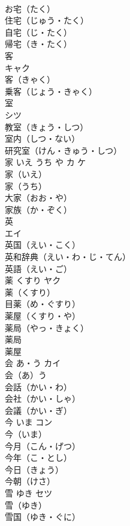 \documentclass[8pt]{extreport}
\begin{document}
\begin{CJK}{UTF8}{min}
\\	お宅（たく）　
\\	住宅（じゅう・たく）　
\\	自宅（じ・たく）　
\\	帰宅（き・たく）　
\\	客	
\\	キャク	
\\	客（きゃく）　
\\	乗客（じょう・きゃく）　
\\	室	
\\	シツ	
\\	教室（きょう・しつ）　
\\	室内（しつ・ない）　
\\	研究室（けん・きゅう・しつ）　
\\	家	いえ うち や	カ ケ	
\\	家（いえ）　
\\	家（うち）　
\\	大家（おお・や）　
\\	家族（か・ぞく）　
\\	英	
\\	エイ	
\\	英国（えい・こく）　
\\	英和辞典（えい・わ・じ・てん）　
\\	英語（えい・ご）　
\\	薬	くすり	ヤク	
\\	薬（くすり）　
\\	目薬（め・ぐすり）　
\\	薬屋（くすり・や）　
\\	薬局（やっ・きょく）　
\\	薬局 
\\	薬屋 
\\	会	あ・う	カイ	
\\	会（あ）う　
\\	会話（かい・わ）　
\\	会社（かい・しゃ）　
\\	会議（かい・ぎ）　
\\	今	いま	コン	
\\	今（いま）　
\\	今月（こん・げつ）　
\\	今年（こ・とし）　
\\	今日（きょう）　
\\	今朝（けさ）　
\\	雪	ゆき	セツ	
\\	雪（ゆき）　
\\	雪国（ゆき・ぐに）　

\end{CJK}
\end{document}
